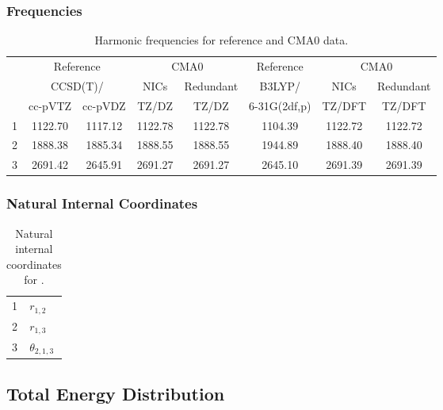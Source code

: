 \documentclass[10pt,oneside]{article}
\begin{document}
\begin{table}[h!]
\subsubsection*{Frequencies}
\centering
\caption{Harmonic frequencies for reference and CMA0 data.}
\begin{tabular}{cccccccc}
\toprule
{} & \multicolumn{2}{c}{Reference} & \multicolumn{2}{c}{CMA0} &    Reference & \multicolumn{2}{c}{CMA0} \\
{} & \multicolumn{2}{c}{CCSD(T)/} &    NICs &  Redundant &       B3LYP/ &    NICs & Redundant \\
{} &   cc-pVTZ & cc-pVDZ &   TZ/DZ &      TZ/DZ & 6-31G(2df,p) &  TZ/DFT &    TZ/DFT \\
\midrule
1 &   1122.70 & 1117.12 & 1122.78 &    1122.78 &      1104.39 & 1122.72 &   1122.72 \\
2 &   1888.38 & 1885.34 & 1888.55 &    1888.55 &      1944.89 & 1888.40 &   1888.40 \\
3 &   2691.42 & 2645.91 & 2691.27 &    2691.27 &      2645.10 & 2691.39 &   2691.39 \\
\bottomrule
\end{tabular}
\end{table}

\begin{table}[h!]
\subsubsection*{Natural Internal Coordinates}
\centering
\caption{Natural internal coordinates for .}
\small
\begin{tabular}{ll}
\toprule
  1   & $r_{1,2}$ \\
  2   & $r_{1,3}$ \\
  3   & $\theta_{2,1,3}$ \\
\bottomrule
\end{tabular}
\end{table}

\begin{table}
\subsection*{Total Energy Distribution}
\centering\end{table}

\clearpage

\subsection{}
\end{document}
